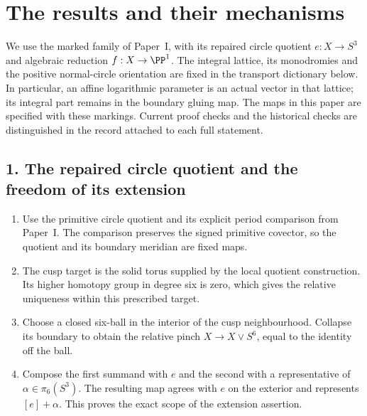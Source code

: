 \section*{The results and their mechanisms}
We use the marked family of Paper~I, with its repaired circle quotient
$e:X\to S^3$ and algebraic reduction $f:X\to\PP^1$.
The integral lattice, its monodromies and the positive normal-circle
orientation are fixed in the transport dictionary below.  In particular,
an affine logarithmic parameter is an actual vector in that lattice;
its integral part remains in the boundary gluing map.  The maps in this
paper are specified with these markings.  Current proof checks and the
historical checks are distinguished in the record attached to each full
statement.

\subsection*{1. The repaired circle quotient and the freedom of its extension}
\RungOne
\begin{enumerate}[label=\arabic*.,leftmargin=*]
\item Use the primitive circle quotient and its explicit period
comparison from Paper~I.  The comparison preserves the signed primitive
covector, so the quotient and its boundary meridian are fixed maps.
\item The cusp target is the solid torus supplied by the local quotient
construction.  Its higher homotopy group in degree six is zero, which
gives the relative uniqueness within this prescribed target.
\item Choose a closed six-ball in the interior of the cusp
neighbourhood.  Collapse its boundary to obtain the relative pinch
$X\to X\vee S^6$, equal to the identity off the ball.
\item Compose the first summand with $e$ and the second with a
representative of $\alpha\in\pi_6(S^3)$.  The resulting map agrees
with $e$ on the exterior and represents $[e]+\alpha$.
This proves the exact scope of the extension assertion.
\end{enumerate}


